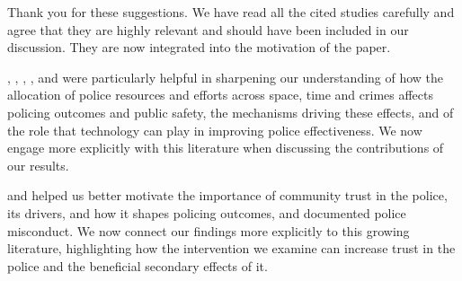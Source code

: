 


Thank you for these suggestions. We have read all the cited studies carefully and agree that they are highly relevant and should have been included in our discussion. They are now integrated into the motivation of the paper.

\citet{Adda_etal_2014}, \citet{Blanes_Mastrobuoni_2018}, \citet{MASTROBUONI2019}, \citet{facchetti2025}, and \citet{Mastrobuoni_2020} were particularly helpful in sharpening our understanding of how the allocation of police resources and efforts across space, time and crimes affects policing outcomes and public safety, the mechanisms driving these effects, and of the role that technology can play in improving police effectiveness. We now engage more explicitly with this literature when discussing the contributions of our results.

\citet{Blanco_2025} and \citet{ang_etal_2025} helped us better motivate the importance of community trust in the police, its drivers, and how it shapes policing outcomes, and \citet{Goncalves_etal_2025} documented police misconduct. We now connect our findings more explicitly to this growing literature, highlighting how the intervention we examine can increase trust in the police and the beneficial secondary effects of it. 


